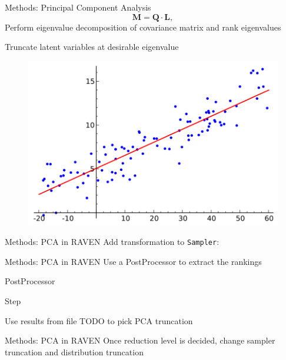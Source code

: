 \documentclass[t,9pt,svgnames]{beamer}
\newcommand{\code}[1]{\texttt{#1}}
\begin{document}
\begin{frame}{Methods: Principal Component Analysis}
  \vfill
  \begin{equation}
    \bm{M} = \bm{Q} \cdot \bm{L},
  \end{equation}
  \vfill
  Perform eigenvalue decomposition of covariance matrix and rank eigenvalues
  \vfill

  Truncate latent variables at desirable eigenvalue
  \vfill
      \begin{figure}
        \includegraphics[width=0.4\linewidth]{pics/pca.png}
      \end{figure}
  \vfill
\end{frame}

\begin{frame}[fragile]{Methods: PCA in RAVEN}
  \vfill
Add transformation to \code{Sampler}:

  \vfill
\end{frame}

\begin{frame}[fragile]{Methods: PCA in RAVEN}
  \vfill
  Use a PostProcessor to extract the rankings
  \vfill

  PostProcessor

  \vfill
  Step

  \vfill
Use results from file TODO to pick PCA truncation
  \vfill
\end{frame}

\begin{frame}[fragile]{Methods: PCA in RAVEN}
  \vfill
  Once reduction level is decided, change sampler truncation and distribution truncation
  
  \vfill
\end{frame}
\end{document}
